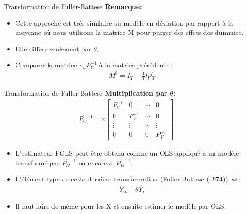 \documentclass{beamer}
\begin{document}
\begin{frame}{Transformation de Fuller-Battese}
\textbf{Remarque:}
\begin{itemize}
\item Cette approche est très similaire au modèle en déviation par rapport à la moyenne où nous utilisons la matrice M pour purger des effets des dummies. 
\item Elle diffère seulement par $\theta$.
\item Comparer la matrice $\sigma_uP_V^{-1}$ à la matrice précédente :
\begin{align*}
M^0=I_T-\frac{1}{T}\wr_T\wr_T^{'}
\end{align*}
\end{itemize}
\end{frame}


\begin{frame}{Transformation de Fuller-Battese}
\textbf{Multiplication par $\theta$:}
\begin{align*}
P_{\Omega}^{'-1}=v\begin{bmatrix} 
P_V^{-1} & 0 & \cdots & 0\\
0 & P_V^{-1} & \cdots & 0 \\
\vdots & \vdots & \ddots & \vdots \\
0 & 0 & 0 & P_V^{-1}
\end{bmatrix}
\end{align*}
\begin{itemize}
\item L’estimateur FGLS peut être obtenu comme un OLS appliqué à un modèle transformé par $P_{\Omega}^{'-1}$ ou encore $\sigma_u P_{\Omega}^{'-1}.$
\item  L’élément type de cette dernière transformation (Fuller-Battese (1974)) est:
\begin{align*}
Y_{it}-\theta \overline{Y}_i
\end{align*}
\item Il faut faire de même pour les X et ensuite estimer le modèle par OLS.
\end{itemize}
\end{frame}
\end{document}
